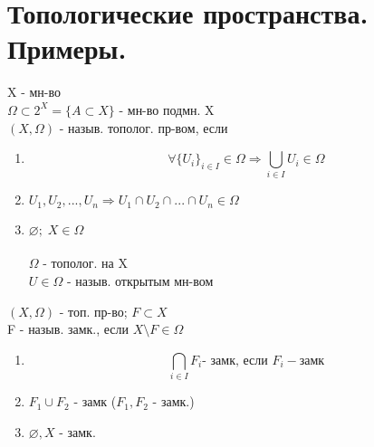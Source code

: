\documentclass[geometry.tex]{subfiles}
\begin{document}
  \section{Топологические пространства. Примеры.}

  \begin{definition}
      X - мн-во\\
      $\Omega \subset 2^X = \{A \subset X\}$ - мн-во подмн. X\\
      $(X, \Omega)$ - назыв. тополог. пр-вом, если\\
      \begin{enumerate}
          \item \[\forall \{U_i\}_{i \in I} \in \Omega \Rightarrow\bigcup_{i \in I} U_i \in \Omega\]
          \item $U_1, U_2, ..., U_n \Rightarrow U_1 \cap U_2 \cap ... \cap U_n \in \Omega$
          \item $\varnothing; \; X \in \Omega$\\\\
          $\Omega$ - тополог. на X\\
          $U \in \Omega$ - назыв. открытым мн-вом
      \end{enumerate}
  \end{definition}

  \begin{definition}
      $(X, \Omega)$ - топ. пр-во; $F \subset X$ \\
      F - назыв. замк., если $X \setminus F \in \Omega$
  \end{definition}

  \begin{theorem}
      \begin{enumerate}
          \item \[\bigcap_{i \in I} F_i \text{- замк, если } F_i - \text{замк}\]
          \item $F_1 \cup F_2$ - замк ($F_1, F_2$ - замк.)
          \item $\varnothing, X$ - замк.
      \end{enumerate}
  \end{theorem}
\end{document}
